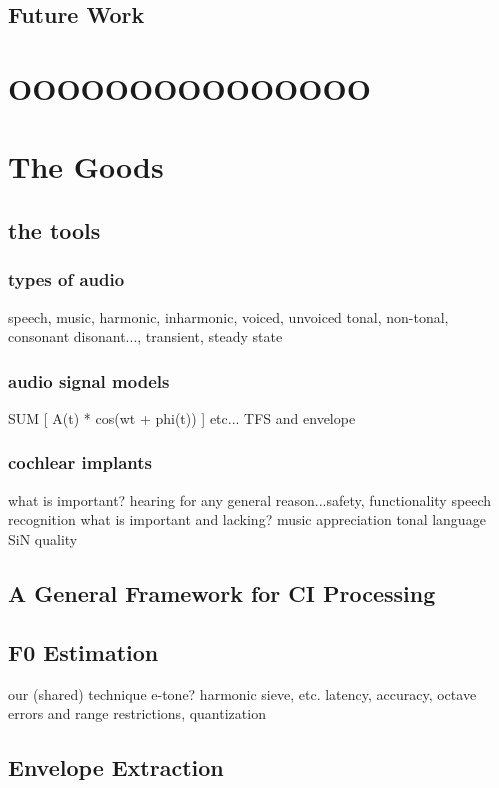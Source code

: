 \documentclass [11pt, proquest] {uwthesis}[2015/03/03]
\begin{document}
\section{Future Work}


 
 
\chapter{OOOOOOOOOOOOOOO}

\chapter{The Goods}

\section{the tools}	
	\subsection{types of audio}
	speech, music, harmonic, inharmonic, voiced, unvoiced
	tonal, non-tonal, consonant disonant..., transient, steady state

	\subsection{audio signal models}
	SUM [ A(t) * cos(wt + phi(t)) ]
	etc...
	TFS and envelope
	
	\subsection{cochlear implants}
	what is important?
		hearing for any general reason...safety, functionality
		speech recognition
	what is important and lacking?
		music appreciation
		tonal language
		SiN
		quality

\section{A General Framework for CI Processing}

\section{F0 Estimation}
	our (shared) technique
	e-tone? harmonic sieve, etc.
	latency, accuracy, octave errors and range restrictions,
	quantization

\section{Envelope Extraction}
\end{document}

